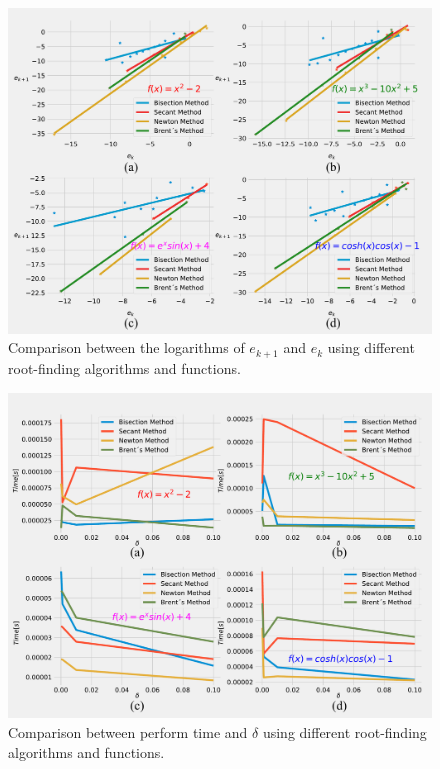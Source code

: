 \documentclass[11pt]{exam}
\begin{document}
\begin{figure}[!h]
	\centering
	\includegraphics[width=12cm]{img/ErrVsErr1.pdf}\caption{Comparison between the logarithms of $e_{k+1}$ and $e_k$ using different root-finding algorithms and functions. }\label{fig:errVserr}
\end{figure}

\begin{figure}[!h]
	\centering
	\includegraphics[width=12cm]{img/TimeVsDelta.pdf}\caption{Comparison between perform time and $\delta$ using different root-finding algorithms and functions. }\label{fig:timeVsdelta}
\end{figure}
\end{document}
